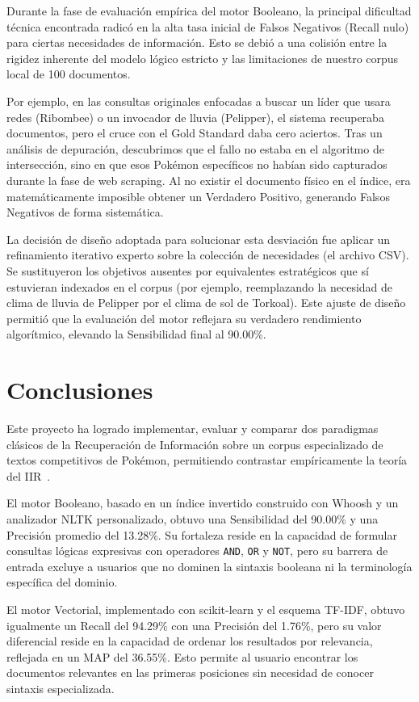 \documentclass[conference,a4paper]{IEEEtran}
\begin{document}
Durante la fase de evaluación empírica del motor Booleano, la principal dificultad técnica encontrada radicó en la alta tasa inicial de Falsos Negativos (Recall nulo) para ciertas necesidades de información. Esto se debió a una colisión entre la rigidez inherente del modelo lógico estricto y las limitaciones de nuestro corpus local de 100 documentos.

Por ejemplo, en las consultas originales enfocadas a buscar un líder que usara redes (Ribombee) o un invocador de lluvia (Pelipper), el sistema recuperaba documentos, pero el cruce con el Gold Standard daba cero aciertos. Tras un análisis de depuración, descubrimos que el fallo no estaba en el algoritmo de intersección, sino en que esos Pokémon específicos no habían sido capturados durante la fase de web scraping. Al no existir el documento físico en el índice, era matemáticamente imposible obtener un Verdadero Positivo, generando Falsos Negativos de forma sistemática.

La decisión de diseño adoptada para solucionar esta desviación fue aplicar un refinamiento iterativo experto sobre la colección de necesidades (el archivo CSV). Se sustituyeron los objetivos ausentes por equivalentes estratégicos que sí estuvieran indexados en el corpus (por ejemplo, reemplazando la necesidad de clima de lluvia de Pelipper por el clima de sol de Torkoal). Este ajuste de diseño permitió que la evaluación del motor reflejara su verdadero rendimiento algorítmico, elevando la Sensibilidad final al 90.00\%.

\section{Conclusiones}

Este proyecto ha logrado implementar, evaluar y comparar dos paradigmas clásicos de la Recuperación de Información sobre un corpus especializado de textos competitivos de Pokémon, permitiendo contrastar empíricamente la teoría del IIR~\cite{b2}.

El motor Booleano, basado en un índice invertido construido con Whoosh y un analizador NLTK personalizado, obtuvo una Sensibilidad del 90.00\% y una Precisión promedio del 13.28\%. Su fortaleza reside en la capacidad de formular consultas lógicas expresivas con operadores \texttt{AND}, \texttt{OR} y \texttt{NOT}, pero su barrera de entrada excluye a usuarios que no dominen la sintaxis booleana ni la terminología específica del dominio.

El motor Vectorial, implementado con scikit-learn y el esquema TF-IDF, obtuvo igualmente un Recall del 94.29\% con una Precisión del 1.76\%, pero su valor diferencial reside en la capacidad de ordenar los resultados por relevancia, reflejada en un MAP del 36.55\%. Esto permite al usuario encontrar los documentos relevantes en las primeras posiciones sin necesidad de conocer sintaxis especializada.
\end{document}
